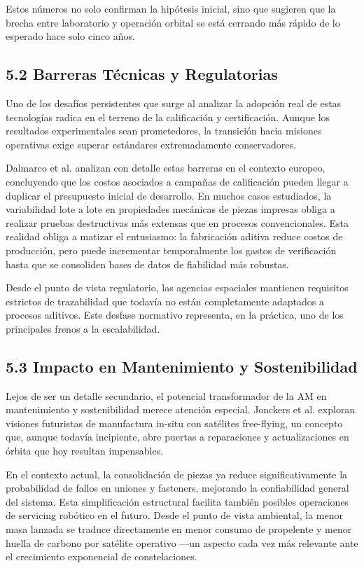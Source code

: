 Estos números no solo confirman la hipótesis inicial, sino que sugieren que la brecha entre laboratorio y operación orbital se está cerrando más rápido de lo esperado hace solo cinco años.

\subsection{5.2 Barreras Técnicas y Regulatorias}

Uno de los desafíos persistentes que surge al analizar la adopción real de estas tecnologías radica en el terreno de la calificación y certificación. Aunque los resultados experimentales sean prometedores, la transición hacia misiones operativas exige superar estándares extremadamente conservadores.

Dalmarco et al. \cite{Dalmarco2026} analizan con detalle estas barreras en el contexto europeo, concluyendo que los costos asociados a campañas de calificación pueden llegar a duplicar el presupuesto inicial de desarrollo. En muchos casos estudiados, la variabilidad lote a lote en propiedades mecánicas de piezas impresas obliga a realizar pruebas destructivas más extensas que en procesos convencionales. Esta realidad obliga a matizar el entusiasmo: la fabricación aditiva reduce costos de producción, pero puede incrementar temporalmente los gastos de verificación hasta que se consoliden bases de datos de fiabilidad más robustas.

Desde el punto de vista regulatorio, las agencias espaciales mantienen requisitos estrictos de trazabilidad que todavía no están completamente adaptados a procesos aditivos. Este desfase normativo representa, en la práctica, uno de los principales frenos a la escalabilidad.

\subsection{5.3 Impacto en Mantenimiento y Sostenibilidad}

Lejos de ser un detalle secundario, el potencial transformador de la AM en mantenimiento y sostenibilidad merece atención especial. Jonckers et al. \cite{Jonckers2022} exploran visiones futuristas de manufactura in-situ con satélites free-flying, un concepto que, aunque todavía incipiente, abre puertas a reparaciones y actualizaciones en órbita que hoy resultan impensables.

En el contexto actual, la consolidación de piezas ya reduce significativamente la probabilidad de fallos en uniones y fasteners, mejorando la confiabilidad general del sistema. Esta simplificación estructural facilita también posibles operaciones de servicing robótico en el futuro. Desde el punto de vista ambiental, la menor masa lanzada se traduce directamente en menor consumo de propelente y menor huella de carbono por satélite operativo —un aspecto cada vez más relevante ante el crecimiento exponencial de constelaciones.

